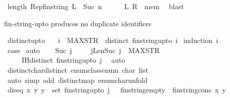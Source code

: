 \begin{isabellebody}
\ {\isachardoublequoteopen}length\ {\isacharparenleft}Rep{\isacharunderscore}fin{\isacharunderscore}string\ L{\isacharparenright}\ {\isasymle}\ Suc\ n{\isachardoublequoteclose}\isanewline
\ \ \ \ \isamarkupfalse%
\ L\ R\ \ mem\ \isamarkupfalse%
\ blast\isanewline
{}\isamarkupfalse%
%
\endisatagproof
{\isafoldproof}%
%
\isadelimproof
%
\endisadelimproof
%
\begin{isamarkuptext}%
fin-string-upto produces no duplicate identifiers%
\end{isamarkuptext}\isamarkuptrue%
\isamarkupfalse%
\ distinct{\isacharunderscore}upto{\isacharcolon}\isanewline
\ \ \ {\isachardoublequoteopen}i\ {\isasymle}\ MAX{\isacharunderscore}STR\ {\isasymLongrightarrow}\ distinct\ {\isacharparenleft}fin{\isacharunderscore}string{\isacharunderscore}upto\ i{\isacharparenright}{\isachardoublequoteclose}\isanewline
%
\isadelimproof
%
\endisadelimproof
%
\isatagproof
{}\isamarkupfalse%
\ {\isacharparenleft}induction\ i{\isacharparenright}\isanewline
\ \ \isamarkupfalse%
\ {}\isanewline
\ \ \isamarkupfalse%
\ \isamarkupfalse%
\ {\isacharquery}case\ \isamarkupfalse%
{\isacharparenleft}auto{\isacharparenright}\isanewline
{}\isamarkupfalse%
\isanewline
\ \ \isamarkupfalse%
\ {\isacharparenleft}Suc\ j{\isacharparenright}\ \isamarkupfalse%
\isanewline
\ \ \isamarkupfalse%
\ jLen{\isacharcolon}{\isachardoublequoteopen}Suc\ j\ {\isasymle}\ MAX{\isacharunderscore}STR{\isachardoublequoteclose}\isanewline
\ \ \ \ \ IH{\isacharcolon}{\isachardoublequoteopen}distinct\ {\isacharparenleft}fin{\isacharunderscore}string{\isacharunderscore}upto\ j{\isacharparenright}{\isachardoublequoteclose}\ \isamarkupfalse%
\ auto\isanewline
\ \ \isamarkupfalse%
\ distinct{\isacharunderscore}char{\isacharcolon}{\isachardoublequoteopen}distinct\ {\isacharparenleft}enum{\isacharunderscore}class{\isachardot}enum{\isacharcolon}{\isacharcolon}\ char\ list{\isacharparenright}{\isachardoublequoteclose}\ \isanewline
\ \ \ \ \isamarkupfalse%
\ {\isacharparenleft}auto\ simp\ add{\isacharcolon}\ distinct{\isacharunderscore}map\ enum{\isacharunderscore}char{\isacharunderscore}unfold{\isacharparenright}\isanewline
\ \ \isamarkupfalse%
\ diseq{\isacharcolon}{\isachardoublequoteopen}{\isasymAnd}\ x\ y{\isachardot}\ y\ {\isasymin}\ set\ {\isacharparenleft}fin{\isacharunderscore}string{\isacharunderscore}upto\ j{\isacharparenright}\ {\isasymLongrightarrow}\ \ fin{\isacharunderscore}string{\isacharunderscore}empty\ {\isasymnoteq}\ fin{\isacharunderscore}string{\isacharunderscore}cons\ x\ y{\isachardoublequoteclose}\ \isanewline

\end{isabellebody}
